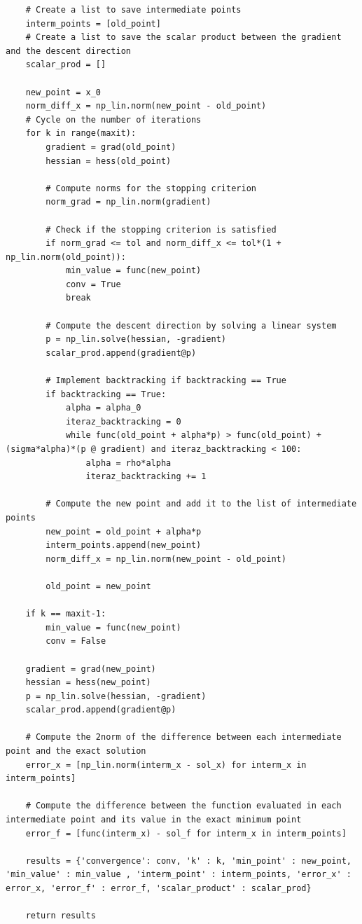 \documentclass[a4paper,11pt]{article}
\begin{document}
\begin{verbatim}
    # Create a list to save intermediate points
    interm_points = [old_point]
    # Create a list to save the scalar product between the gradient and the descent direction
    scalar_prod = []

    new_point = x_0 
    norm_diff_x = np_lin.norm(new_point - old_point)
    # Cycle on the number of iterations
    for k in range(maxit):
        gradient = grad(old_point)
        hessian = hess(old_point)

        # Compute norms for the stopping criterion
        norm_grad = np_lin.norm(gradient)

        # Check if the stopping criterion is satisfied
        if norm_grad <= tol and norm_diff_x <= tol*(1 + np_lin.norm(old_point)):            
            min_value = func(new_point)
            conv = True
            break

        # Compute the descent direction by solving a linear system
        p = np_lin.solve(hessian, -gradient)
        scalar_prod.append(gradient@p)

        # Implement backtracking if backtracking == True
        if backtracking == True:
            alpha = alpha_0
            iteraz_backtracking = 0 
            while func(old_point + alpha*p) > func(old_point) + (sigma*alpha)*(p @ gradient) and iteraz_backtracking < 100:
                alpha = rho*alpha
                iteraz_backtracking += 1         

        # Compute the new point and add it to the list of intermediate points
        new_point = old_point + alpha*p
        interm_points.append(new_point)
        norm_diff_x = np_lin.norm(new_point - old_point)

        old_point = new_point

    if k == maxit-1:
        min_value = func(new_point)
        conv = False

    gradient = grad(new_point)
    hessian = hess(new_point)
    p = np_lin.solve(hessian, -gradient)
    scalar_prod.append(gradient@p)

    # Compute the 2norm of the difference between each intermediate point and the exact solution
    error_x = [np_lin.norm(interm_x - sol_x) for interm_x in interm_points]

    # Compute the difference between the function evaluated in each intermediate point and its value in the exact minimum point
    error_f = [func(interm_x) - sol_f for interm_x in interm_points]

    results = {'convergence': conv, 'k' : k, 'min_point' : new_point, 'min_value' : min_value , 'interm_point' : interm_points, 'error_x' : error_x, 'error_f' : error_f, 'scalar_product' : scalar_prod}

    return results

\end{verbatim}
\end{document}
